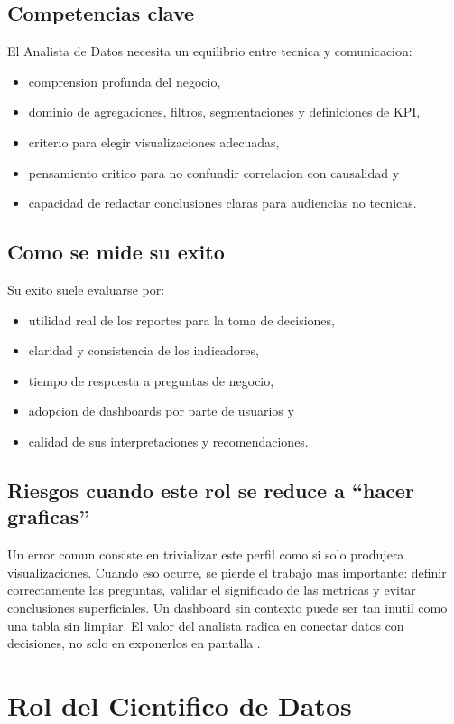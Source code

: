 \documentclass[12pt]{article}
\begin{document}
\subsection{Competencias clave}
El Analista de Datos necesita un equilibrio entre tecnica y comunicacion:
\begin{itemize}[leftmargin=*]
\item comprension profunda del negocio,
\item dominio de agregaciones, filtros, segmentaciones y definiciones de KPI,
\item criterio para elegir visualizaciones adecuadas,
\item pensamiento critico para no confundir correlacion con causalidad y
\item capacidad de redactar conclusiones claras para audiencias no tecnicas.
\end{itemize}

\subsection{Como se mide su exito}
Su exito suele evaluarse por:
\begin{itemize}[leftmargin=*]
\item utilidad real de los reportes para la toma de decisiones,
\item claridad y consistencia de los indicadores,
\item tiempo de respuesta a preguntas de negocio,
\item adopcion de dashboards por parte de usuarios y
\item calidad de sus interpretaciones y recomendaciones.
\end{itemize}

\subsection{Riesgos cuando este rol se reduce a ``hacer graficas''}
Un error comun consiste en trivializar este perfil como si solo produjera visualizaciones. Cuando eso ocurre, se pierde el trabajo mas importante: definir correctamente las preguntas, validar el significado de las metricas y evitar conclusiones superficiales. Un dashboard sin contexto puede ser tan inutil como una tabla sin limpiar. El valor del analista radica en conectar datos con decisiones, no solo en exponerlos en pantalla \cite{aws_analytics,provost_fawcett}.

\section{Rol del Cientifico de Datos}
\end{document}
